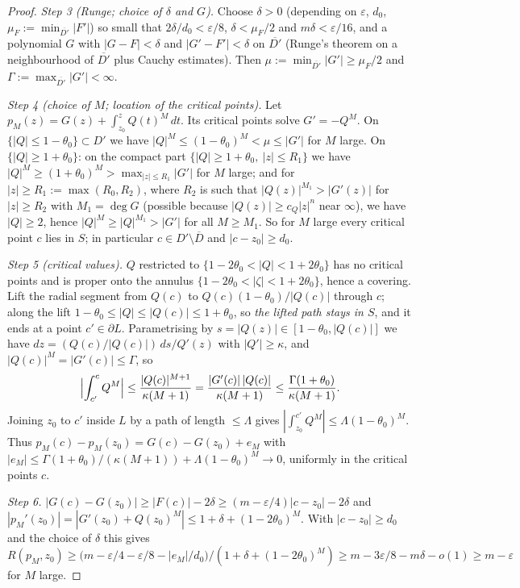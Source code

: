 \documentclass[11pt]{article}
\numberwithin{equation}{section}
\theoremstyle{definition}
\theoremstyle{remark}
\begin{document}
\begin{proof}
\emph{Step 3 (Runge; choice of $\delta$ and $G$).} Choose $\delta>0$ (depending on $\varepsilon$, $d_0$,
$\mu_F:=\min_{\overline{D'}}|F'|$) so small that $2\delta/d_0<\varepsilon/8$, $\delta<\mu_F/2$ and
$m\delta<\varepsilon/16$, and a polynomial $G$ with $|G-F|<\delta$ and $|G'-F'|<\delta$ on
$\overline{D'}$ (Runge's theorem on a neighbourhood of $\overline{D'}$ plus Cauchy estimates). Then
$\mu:=\min_{\overline{D'}}|G'|\ge\mu_F/2$ and $\Gamma:=\max_{\overline{D'}}|G'|<\infty$.

\emph{Step 4 (choice of $M$; location of the critical points).} Let
$p_M(z)=G(z)+\int_{z_0}^zQ(t)^M\,dt$. Its critical points solve $G'=-Q^M$. On
$\{|Q|\le1-\theta_0\}\subset D'$ we have $|Q|^M\le(1-\theta_0)^M<\mu\le|G'|$ for $M$ large. On
$\{|Q|\ge1+\theta_0\}$: on the compact part $\{|Q|\ge1+\theta_0,\ |z|\le R_1\}$ we have
$|Q|^M\ge(1+\theta_0)^M>\max_{|z|\le R_1}|G'|$ for $M$ large; and for $|z|\ge R_1:=\max(R_0,R_2)$, where
$R_2$ is such that $|Q(z)|^{M_1}>|G'(z)|$ for $|z|\ge R_2$ with $M_1=\deg G$ (possible because
$|Q(z)|\ge c_Q|z|^n$ near $\infty$), we have $|Q|\ge2$, hence $|Q|^M\ge|Q|^{M_1}>|G'|$ for all
$M\ge M_1$. So for $M$ large every critical point $c$ lies in $S$; in particular
$c\in D'\setminus\overline D$ and $|c-z_0|\ge d_0$.

\emph{Step 5 (critical values).} $Q$ restricted to $\{1-2\theta_0<|Q|<1+2\theta_0\}$ has no critical
points and is proper onto the annulus $\{1-2\theta_0<|\zeta|<1+2\theta_0\}$, hence a covering. Lift the
radial segment from $Q(c)$ to $Q(c)(1-\theta_0)/|Q(c)|$ through $c$; along the lift
$1-\theta_0\le|Q|\le|Q(c)|\le1+\theta_0$, so \emph{the lifted path stays in $S$}, and it ends at a point
$c'\in\partial L$. Parametrising by $s=|Q(z)|\in[1-\theta_0,|Q(c)|]$ we have
$dz=(Q(c)/|Q(c)|)\,ds/Q'(z)$ with $|Q'|\ge\kappa$, and $|Q(c)|^M=|G'(c)|\le\Gamma$, so
\[
  \Bigl|\int_{c'}^{c}Q^M\Bigr|\le\frac{|Q(c)|^{M+1}}{\kappa(M+1)}=\frac{|G'(c)|\,|Q(c)|}{\kappa(M+1)}
  \le\frac{\Gamma(1+\theta_0)}{\kappa(M+1)} .
\]
Joining $z_0$ to $c'$ inside $L$ by a path of length $\le\Lambda$ gives
$|\int_{z_0}^{c'}Q^M|\le\Lambda(1-\theta_0)^M$. Thus $p_M(c)-p_M(z_0)=G(c)-G(z_0)+e_M$ with
$|e_M|\le\Gamma(1+\theta_0)/(\kappa(M+1))+\Lambda(1-\theta_0)^M\to0$, uniformly in the critical
points $c$.

\emph{Step 6.} $|G(c)-G(z_0)|\ge|F(c)|-2\delta\ge(m-\varepsilon/4)|c-z_0|-2\delta$ and
$|p_M'(z_0)|=|G'(z_0)+Q(z_0)^M|\le1+\delta+(1-2\theta_0)^M$. With $|c-z_0|\ge d_0$ and the choice of
$\delta$ this gives $R(p_M,z_0)\ge\bigl(m-\varepsilon/4-\varepsilon/8-|e_M|/d_0\bigr)/(1+\delta+(1-2\theta_0)^M)
\ge m-3\varepsilon/8-m\delta-o(1)\ge m-\varepsilon$ for $M$ large.
\end{proof}
\end{document}
